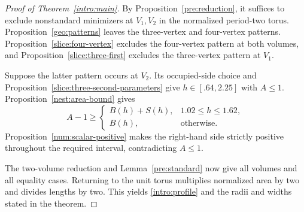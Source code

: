 \documentclass[11pt]{article}
\theoremstyle{remark}
\numberwithin{equation}{section}
\begin{document}
\begin{proof}[Proof of Theorem~\ref{intro:main}]
By Proposition~\ref{pre:reduction}, it suffices to exclude nonstandard
minimizers at \(V_1,V_2\) in the normalized period-two torus.
Proposition~\ref{geo:patterns} leaves the three-vertex and four-vertex
patterns. Proposition~\ref{slice:four-vertex} excludes the four-vertex
pattern at both volumes, and Proposition~\ref{slice:three-first}
excludes the three-vertex pattern at \(V_1\).

Suppose the latter pattern occurs at \(V_2\).
Its occupied-side choice and
Proposition~\ref{slice:three-second-parameters} give
\(h\in[.64,2.25]\) with \(A\le1\).
Proposition~\ref{nest:area-bound} gives
\[
 A-1\ge
 \begin{cases}
 B(h)+S(h),&1.02\le h\le1.62,\\
 B(h),&\text{otherwise}.
 \end{cases}
\]
Proposition~\ref{num:scalar-positive} makes the right-hand side strictly
positive throughout the required interval, contradicting \(A\le1\).

The two-volume reduction and Lemma~\ref{pre:standard} now give all
volumes and all equality cases. Returning to the unit torus multiplies
normalized area by two and divides lengths by two. This yields
\eqref{intro:profile} and the radii and widths stated in the theorem.
\end{proof}

\appendix



\end{document}
